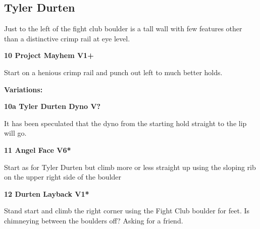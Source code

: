 \begin{multicols}{2}
\needspace{1.5cm}
\subsection*{Tyler Durten}\label{bf:Tyler Durten}
Just to the left of the fight club boulder is a tall wall with few features other than a distinctive crimp rail at eye level.\\
	


\needspace{1.5cm}
\label{rt:Project Mayhem}
\colorbox{green!20}{
\parbox{0.95\linewidth}{
\textbf{
10 Project Mayhem V1+  
}}}

\begin{adjustwidth}{0.5cm}{}			
Start on a henious crimp rail and punch out left to much better holds.
\end{adjustwidth}

\begin{adjustwidth}{0.5cm}{}				
\needspace{3cm}
\textbf{Variations:} \newline

\needspace{1.5cm}
\label{vr:Tyler Durten Dyno}
\colorbox{black!20}{
\parbox{0.95\linewidth}{
\textbf{
10a Tyler Durten Dyno V?  
}}}

\begin{adjustwidth}{0.5cm}{}			
It has been speculated that the dyno from the starting hold straight to the lip will go.
\end{adjustwidth}


\end{adjustwidth}


\needspace{1.5cm}
\label{rt:Angel Face}
\colorbox{RoyalBlue!20}{
\parbox{0.95\linewidth}{
\textbf{
11 Angel Face V6*  
}}}

\begin{adjustwidth}{0.5cm}{}			
Start as for Tyler Durten but climb more or less straight up using the sloping rib on the upper right side of the boulder
\end{adjustwidth}



\needspace{1.5cm}
\label{rt:Durten Layback}
\colorbox{green!20}{
\parbox{0.95\linewidth}{
\textbf{
12 Durten Layback V1*  
}}}

\begin{adjustwidth}{0.5cm}{}			
Stand start and climb the right corner using the Fight Club boulder for feet. Is chimneying between the boulders off? Asking for a friend.
\end{adjustwidth}





\end{multicols}
